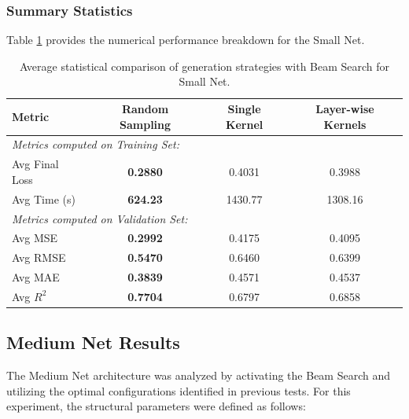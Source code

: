 \subsubsection{Summary Statistics}

Table \ref{tab:small_net_comp_bs_results} provides the numerical performance breakdown for the Small Net.

\begin{table}[h]
\centering
\scriptsize
\begin{tabular}{|l|c|c|c|}
\hline
\textbf{Metric} & \textbf{Random Sampling} & \textbf{Single Kernel} & \textbf{Layer-wise Kernels} \\ \hline
\multicolumn{4}{|l|}{\textit{Metrics computed on Training Set:}} \\ \hline
Avg Final Loss        & \textbf{0.2880}                       & 0.4031                 & 0.3988                      \\ \hline
Avg Time (s)          & \textbf{624.23}                       & 1430.77                & 1308.16                     \\ \hline
\multicolumn{4}{|l|}{\textit{Metrics computed on Validation Set:}} \\ \hline
Avg MSE               & \textbf{0.2992}                       & 0.4175                 & 0.4095                      \\ \hline
Avg RMSE              & \textbf{0.5470}                       & 0.6460                 & 0.6399                      \\ \hline
Avg MAE               & \textbf{0.3839}                       & 0.4571                 & 0.4537                      \\ \hline
Avg $R^2$             & \textbf{0.7704}                       & 0.6797                 & 0.6858                      \\ \hline
\end{tabular}
\caption{Average statistical comparison of generation strategies with Beam Search for Small Net.}
\label{tab:small_net_comp_bs_results}
\end{table}

\newpage

\subsection{Medium Net Results}

The Medium Net architecture was analyzed by activating the Beam Search and utilizing the optimal configurations identified in previous tests. For this experiment, the structural parameters were defined as follows:

